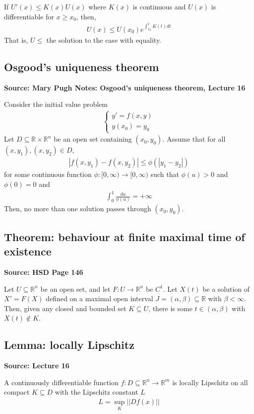 \documentclass[11pt]{article}
\newcommand{\R}{\mathbb{R}}
\begin{document}
If $U'(x) \leq K(x) U(x)$ where $K(x)$ is continuous and $U(x)$ is differentiable for $x \geq x_0$, then, 
\begin{align*}
    U(x) \leq U(x_0) e^{\int_{x_0}^x K(t) dt}
\end{align*}
That is, $U \leq$ the solution to the case with equality. 

\subsection{Osgood's uniqueness theorem}
\textbf{Source: Mary Pugh Notes: Osgood's uniqueness theorem, Lecture 16}

Consider the initial value problem 
\begin{align*}
    \begin{cases}
    y' = f(x,y) \\
    y(x_0) = y_0
    \end{cases}
\end{align*}
Let $D \subseteq \R \times \R^n$ be an open set containing $(x_0, y_0)$. Assume that for all $(x, y_1), (x, y_2) \in D$, 
\begin{align*}
    |f(x, y_1) - f(x, y_2)| \leq \phi(|y_1 - y_2|)
\end{align*}
for some continuous function $\phi: [0, \infty) \to [0, \infty)$ such that $\phi(u) > 0$ and $\phi(0) = 0$ and 
\begin{align*}
    \int_0^1 \frac{du}{\phi(u)} = + \infty 
\end{align*}
Then, no more than one solution passes through $(x_0, y_0)$. 

\subsection{Theorem: behaviour at finite maximal time of existence} 
\textbf{Source: HSD Page 146}

Let $U \subseteq \R^n$ be an open set, and let $F: U \to \R^n$ be $C^1$. Let $X(t)$ be a solution of $X' = F(X)$ defined on a maximal open interval $J = (\alpha, \beta) \subseteq \R$ with $\beta < \infty$. Then, given any closed and bounded set $K \subseteq U$, there is some $t \in (\alpha, \beta)$ with $X(t) \notin K$. 

\subsection{Lemma: locally Lipschitz}
\textbf{Source: Lecture 16}

A continuously differentiable function $f: D \subseteq \R^n \to \R^m$ is locally Lipschitz on all compact $K \subseteq D$ with the Lipschitz constant $L$
\begin{align*}
    L = \sup_{K} ||Df(x)||
\end{align*}
\end{document}
